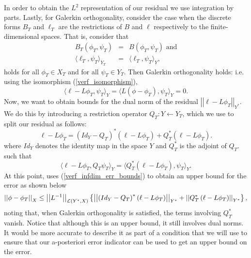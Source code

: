 \documentclass[12pt,a4paper]{article}
\theoremstyle{definition}
\begin{document}
 In order to obtain the $L^2$ representation of our residual we use integration by parts.  Lastly, for Galerkin orthogonality, consider the case when the discrete forms $B_T$ and $\ell_T$ are the restrictions of $B$ and $\ell$ respectively to the finite-dimensional spaces.  That is, consider that
 \begin{eqnarray}
B_T\left(\phi_T,\psi_T\right)&=&B\left(\phi_T,\psi_T\right)\text{ and}\\
\langle \ell_T, \psi_T\rangle_{Y_T} &=& \langle \ell_T, \psi_T\rangle_{Y},
 \end{eqnarray}
 holds for all $\phi_T\in X_T$ and for all $\psi_T \in Y_T$.  Then Galerkin orthogonality holds: i.e. using the isomorphism (\ref{verf_isomorphism}),
 \begin{equation}
\langle \ell -L\phi_T,\psi_T\rangle_{Y}=\langle L\left(\phi-\phi_T\right),\psi_T\rangle_{Y}=0.
 \end{equation}
 Now, we want to obtain bounds for the dual norm of the residual $\left|\left|\ell-L\phi_T\right|\right|_{Y^*}$.  We do this by introducing a restriction operator $Q_T:Y\leftarrow Y_T$, which we use to split our residual as follows:
 \begin{equation}\label{verf_residual_split}
 	\ell-L\phi_T=\left(Id_Y-Q_T\right)^*\left(\ell-L\phi_T\right)+Q_T^*\left(\ell-L\phi_T\right).
 \end{equation}
 where $Id_Y$ denotes the identity map in the space $Y$ and $Q_T^*$ is the adjoint of $Q_T$. such that 
 \begin{equation}
\langle \ell -L\phi_T, Q_T\psi_T\rangle_Y = \langle Q_T^*\left(\ell -L\phi_T\right), \psi_T\rangle_Y. 
 \end{equation}  
 At this point, \cite{verfurth2013posteriori} uses (\ref{verf_infdim_err_bounds}) to obtain an upper bound for the error as shown below
 \begin{equation}\small
\left|\left|\phi-\phi_T\right|\right|_X\leq \left|\left|L^{-1}\right|\right|_{\mathcal{L}\left(Y^*,X\right)}\left\lbrace\left|\left| \left(Id_Y-Q_T\right)^*\left(\ell-L\phi_T\right)\right|\right|_{Y^*} +\left|\left| Q_T^*\left(\ell-L\phi_T\right)\right|\right|_{Y^*}\right\rbrace,
 \end{equation}
 noting that, when Galerkin orthogonality is satisfied, the terms involving $Q_T^*$ vanish.  Notice that although this is an upper bound, it still involves dual norms.  It would be more accurate to describe it as part of a condition that we will use to ensure that our a-posteriori error indicator can be used to get an upper bound on the error.
 
\end{document}
